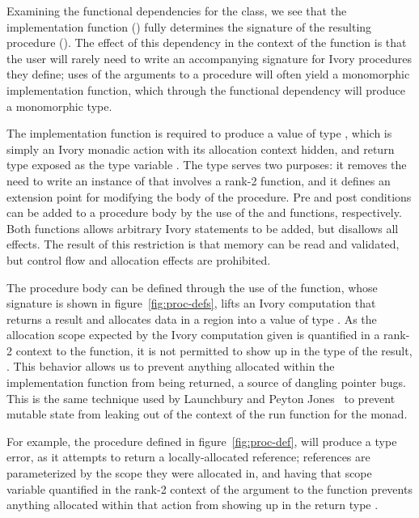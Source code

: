 Examining the functional dependencies for the  class, we see
that the implementation function () fully determines the signature of
the resulting procedure ().  The effect of this dependency in the
context of the  function is that the user will rarely need to write an
accompanying  signature for Ivory procedures they define; uses of the
arguments to a procedure will often yield a monomorphic implementation function,
which through the functional dependency will produce a monomorphic 
type.

The implementation function is required to produce a value of type ,
which is simply an Ivory monadic action with its allocation context hidden, and
return type exposed as the type variable .  The  type serves two
purposes: it removes the need to write an instance of  that
involves a rank-2 function, and it defines an extension point for modifying the
body of the procedure.  Pre and post conditions can be added to a procedure body
by the use of the  and  functions, respectively.  Both
functions allows arbitrary Ivory statements to be added, but disallows all
effects.  The result of this restriction is that memory can be read and
validated, but control flow and allocation effects are prohibited.

The procedure body can be defined through the use of the  function,
whose signature is shown in figure~\ref{fig:proc-defs}, lifts an Ivory
computation that returns a result  and allocates data in a region 
into a value of type .  As the allocation scope expected by the Ivory
computation given is quantified in a rank-2 context to the  function,
it is not permitted to show up in the type of the result, .  This behavior
allows us to prevent anything allocated within the implementation function from
being returned, a source of dangling pointer bugs.  This is the same technique
used by Launchbury and Peyton Jones~\cite{stmonad} to prevent mutable state
from leaking out of the context of the run function for the  monad.

For example, the procedure  defined in figure~\ref{fig:proc-def}, will
produce a type error, as it attempts to return a locally-allocated reference;
references are parameterized by the scope they were allocated in, and having
that scope variable quantified in the rank-2 context of the argument to the
 function prevents anything allocated within that action from showing
up in the return type .

